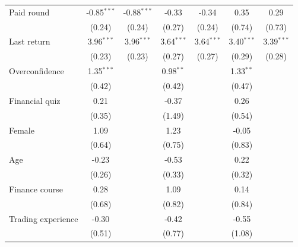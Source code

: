 \begin{table}[htbp]
\begin{tabular}{lcccccc}
      Paid round                        & -0.85$^{***}$ & -0.88$^{***}$ & -0.33         & -0.34         & 0.35          & 0.29\\   
                                        & (0.24)        & (0.24)        & (0.27)        & (0.24)        & (0.74)        & (0.73)\\   
      Last return                       & 3.96$^{***}$  & 3.96$^{***}$  & 3.64$^{***}$  & 3.64$^{***}$  & 3.40$^{***}$  & 3.39$^{***}$\\   
                                        & (0.23)        & (0.23)        & (0.27)        & (0.27)        & (0.29)        & (0.28)\\   
      Overconfidence                    & 1.35$^{***}$  &               & 0.98$^{**}$   &               & 1.33$^{**}$   &   \\   
                                        & (0.42)        &               & (0.42)        &               & (0.47)        &   \\   
      Financial quiz                    & 0.21          &               & -0.37         &               & 0.26          &   \\   
                                        & (0.35)        &               & (1.49)        &               & (0.54)        &   \\   
      Female                            & 1.09          &               & 1.23          &               & -0.05         &   \\   
                                        & (0.64)        &               & (0.75)        &               & (0.83)        &   \\   
      Age                               & -0.23         &               & -0.53         &               & 0.22          &   \\   
                                        & (0.26)        &               & (0.33)        &               & (0.32)        &   \\   
      Finance course                    & 0.28          &               & 1.09          &               & 0.14          &   \\   
                                        & (0.68)        &               & (0.82)        &               & (0.84)        &   \\   
      Trading experience                & -0.30         &               & -0.42         &               & -0.55         &   \\   
                                        & (0.51)        &               & (0.77)        &               & (1.08)        &   \\   

\end{tabular}
\end{table}
